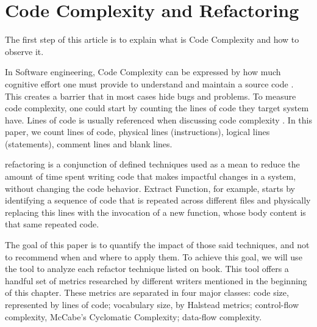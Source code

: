 \section{Code Complexity and Refactoring}

The first step of this article is to explain what is Code Complexity and how to observe it.

In Software engineering, Code Complexity can be expressed by how much cognitive effort one must provide to understand
and maintain a source code \cite{article:fmricc}. This creates a barrier that in most cases hide bugs and problems.
To measure code complexity, one could start by counting the lines of code they target system have. Lines of code is usually
referenced when discussing code complexity \cite{article:rustcc}. In this paper, we count lines of code, physical lines (instructions),
logical lines (statements), comment lines and blank lines.


\cite{book:refactoring} refactoring is a conjunction of defined techniques used as a mean to reduce the amount of
time spent writing code that makes impactful changes in a system, without changing the code behavior. Extract Function,
for example, starts by identifying a sequence of code that is repeated across different files and physically replacing
this lines with the invocation of a new function, whose body content is that same repeated code.


The goal of this paper is to quantify the impact of those said techniques, and not to recommend when and where to apply them.
To achieve this goal, we will use the \cite{article:mozilla} tool to analyze each refactor technique listed on
\cite{book:refactoring} book. This tool offers a handful set of metrics researched by
different writers mentioned in the beginning of this chapter. These metrics are separated in four major classes: code size,
represented by lines of code; vocabulary size, by Halstead metrics; control-flow complexity, McCabe's Cyclomatic
Complexity; data-flow complexity.
